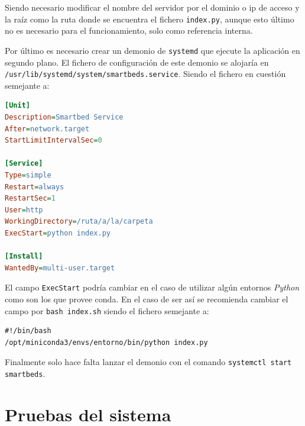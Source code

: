 Siendo necesario modificar el nombre del servidor por el dominio o ip de acceso y la raíz como la ruta donde se encuentra el fichero \texttt{index.py}, aunque esto último no es necesario para el funcionamiento, solo como referencia interna.

Por último es necesario crear un demonio de \texttt{systemd} que ejecute la aplicación en segundo plano. El fichero de configuración de este demonio se alojaría en \texttt{/usr/lib/systemd/system/smartbeds.service}. Siendo el fichero en cuestión semejante a:
\begin{lstlisting}[language={Ini}]
[Unit]
Description=Smartbed Service
After=network.target
StartLimitIntervalSec=0

[Service]
Type=simple
Restart=always
RestartSec=1
User=http
WorkingDirectory=/ruta/a/la/carpeta
ExecStart=python index.py

[Install]
WantedBy=multi-user.target
\end{lstlisting}

El campo \texttt{ExecStart} podría cambiar en el caso de utilizar algún entornos \textit{Python} como son los que provee conda. En el caso de ser así se recomienda cambiar el campo por \texttt{bash index.sh} siendo el fichero semejante a:

\begin{lstlisting}[language=bashb]
#!/bin/bash
/opt/miniconda3/envs/entorno/bin/python index.py
\end{lstlisting}

Finalmente solo hace falta lanzar el demonio con el comando \texttt{systemctl start smartbeds}.

\section{Pruebas del sistema}
